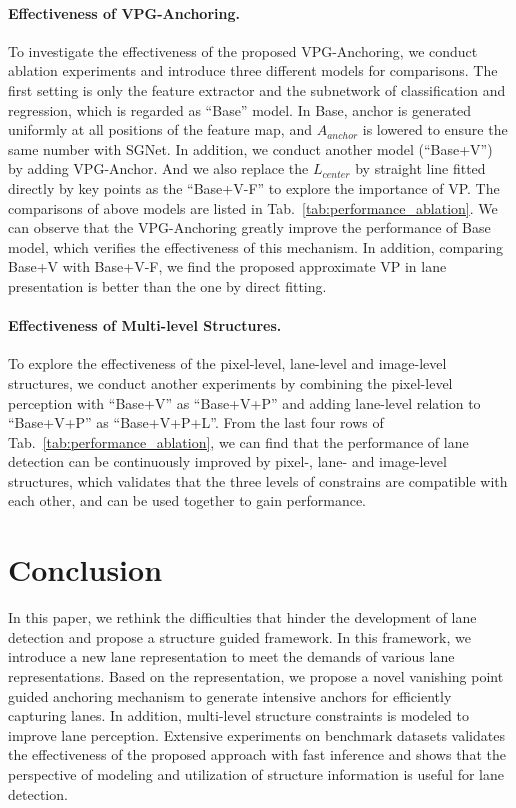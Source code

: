 \documentclass{article}
\begin{document}
\paragraph{Effectiveness of VPG-Anchoring.}
To investigate the effectiveness of the proposed VPG-Anchoring, we conduct ablation experiments and introduce three different models for comparisons. The first setting is only the feature
extractor and the subnetwork of classification and regression, which is regarded as ``Base'' model. In Base, anchor is generated uniformly at all positions of the feature map, and $A_{anchor}$ is lowered to ensure the same number with SGNet. In addition, we conduct another model (``Base+V'') by adding VPG-Anchor. And we also replace the $L_{center}$ by straight line fitted directly by key points as the ``Base+V-F'' to explore the importance of VP. The comparisons of above models are listed in Tab.~\ref{tab:performance_ablation}. We can observe that the VPG-Anchoring greatly improve the performance
 of Base model, which verifies the effectiveness of this mechanism. In addition, comparing Base+V with Base+V-F, we find the proposed approximate VP in lane presentation is better than the one by direct fitting.

\paragraph{Effectiveness of Multi-level Structures.}
To explore the effectiveness of the pixel-level, lane-level and image-level structures, we conduct another experiments by combining the pixel-level perception with ``Base+V'' as ``Base+V+P'' and 
adding lane-level relation to ``Base+V+P'' as 
``Base+V+P+L''. From the last four rows of Tab.~\ref{tab:performance_ablation}, we can find that the performance of lane detection can be continuously improved by pixel-, lane- and image-level structures, which validates that the three levels of constrains are compatible with each other, and can be used together to gain performance. 

\section{Conclusion}

In this paper, we rethink the difficulties 
that hinder the development of lane detection 
and propose a structure guided framework. In this framework, we introduce a new lane representation to meet the demands of various lane representations. Based on the representation, we propose a novel vanishing point guided anchoring mechanism to generate intensive anchors for efficiently capturing lanes.  
In addition, multi-level structure constraints is modeled to improve lane perception. Extensive experiments on benchmark datasets validates the effectiveness of the proposed approach with fast inference 
and shows that the perspective of modeling and utilization of structure information is useful for lane detection.



\end{document}
